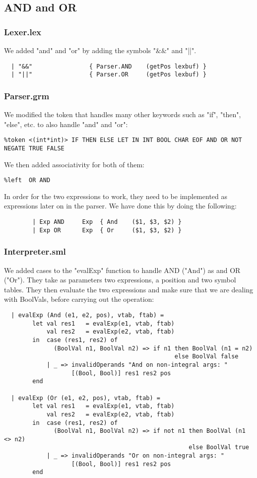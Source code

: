 \documentclass[12pt]{article}
\begin{document}
\subsection{AND and OR}
\subsubsection{Lexer.lex}
We added "and" and "or" by adding the symbols "\(\&\&\)" and "||". 
\begin{verbatim}
  | "&&"                { Parser.AND    (getPos lexbuf) }
  | "||"                { Parser.OR     (getPos lexbuf) }
\end{verbatim}
\subsubsection{Parser.grm}
We modified the token that handles many other keywords such as "if", "then", "else", etc. to also handle "and" and "or":
\begin{verbatim}
%token <(int*int)> IF THEN ELSE LET IN INT BOOL CHAR EOF AND OR NOT NEGATE TRUE FALSE
\end{verbatim}
We then added associativity for both of them: 
\begin{verbatim}
%left  OR AND
\end{verbatim}
In order for the two expressions to work, they need to be implemented as expressions later on in the parser. We have done this by doing the following:
\begin{verbatim}
        | Exp AND     Exp  { And    ($1, $3, $2) }
        | Exp OR      Exp  { Or     ($1, $3, $2) }
\end{verbatim}
\subsubsection{Interpreter.sml}
We added cases to the "evalExp" function to handle AND ("And") as and OR ("Or"). They take as parameters two expressions, a position and two symbol tables. They then evaluate the two expressions and make sure that we are dealing with BoolVals, before carrying out the operation:
\begin{verbatim}
  | evalExp (And (e1, e2, pos), vtab, ftab) =
        let val res1   = evalExp(e1, vtab, ftab)
            val res2   = evalExp(e2, vtab, ftab)
        in  case (res1, res2) of
              (BoolVal n1, BoolVal n2) => if n1 then BoolVal (n1 = n2) 
                                                else BoolVal false
            | _ => invalidOperands "And on non-integral args: "
                   [(Bool, Bool)] res1 res2 pos
        end

  | evalExp (Or (e1, e2, pos), vtab, ftab) =
        let val res1   = evalExp(e1, vtab, ftab)
            val res2   = evalExp(e2, vtab, ftab)
        in  case (res1, res2) of
              (BoolVal n1, BoolVal n2) => if not n1 then BoolVal (n1 <> n2) 
                                                    else BoolVal true
            | _ => invalidOperands "Or on non-integral args: " 
                   [(Bool, Bool)] res1 res2 pos
        end
\end{verbatim}
\end{document}
